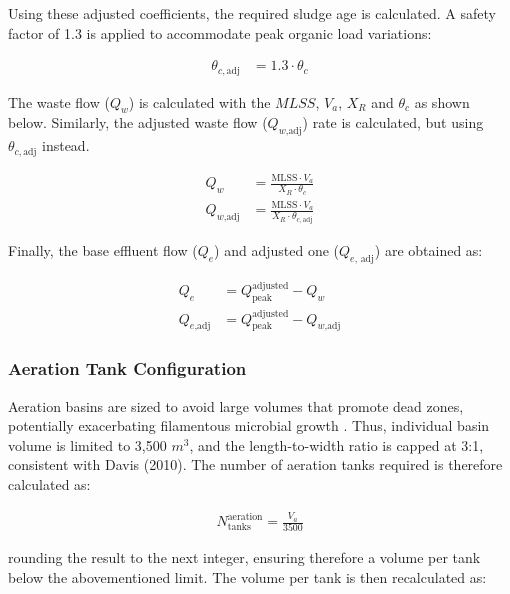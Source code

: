 \documentclass[11pt]{article}
\begin{document}
Using these adjusted coefficients, the required 
sludge age is calculated. A safety factor 
of 1.3 is applied to accommodate peak organic load variations:

\begin{align}
\theta_{c,\text{adj}} &= 1.3 \cdot \theta_c \label{eq:sludge_age_adjusted}
\end{align}

The waste flow ($Q_w$) is calculated with the $MLSS$, $V_a$,
$X_R$ and $\theta_c$ as shown below. Similarly, the 
adjusted waste flow ($Q_{w\text{,adj}}$) rate is calculated, but using 
$\theta_{c,\text{adj}}$ instead.

\begin{align}
Q_w &= \frac{\text{MLSS} \cdot V_a}{X_R \cdot \theta_c} \label{eq:flow_waste}\\
Q_{w\text{,adj}} &= \frac{\text{MLSS} \cdot V_a}{X_R \cdot \theta_{c,\text{adj}}} \label{eq:flow_waste_adj}
\end{align}

Finally, the base effluent flow ($Q_e$) and adjusted one ($Q_{e\text{, adj}}$) are obtained as:

\begin{align}
Q_e &= Q_{\text{peak}}^{\text{adjusted}} - Q_w \label{eq:effluent_flow}\\
Q_{e\text{,adj}} &= Q_{\text{peak}}^{\text{adjusted}} - Q_{w\text{,adj}} \label{eq:effluent_flow_adj}
\end{align}

\subsubsection{Aeration Tank Configuration}
\label{sec:aeration_tank_configuration}
Aeration basins are sized to avoid large volumes 
that promote dead zones, potentially exacerbating 
filamentous microbial growth \cite{chudoba1973control}. 
Thus, individual basin volume is limited to 3,500 $m^3$, 
and the length-to-width ratio is capped at 3:1, 
consistent with Davis (2010). The number of aeration 
tanks required is therefore calculated as:

\begin{align}
  N_{\text{tanks}}^{\text{aeration}}=\frac{V_a}{3500} \label{eq:number_aeration_tanks}
\end{align}

rounding the result to the next integer, ensuring therefore 
a volume per tank below the abovementioned limit. The volume 
per tank is then recalculated as: 
\end{document}

